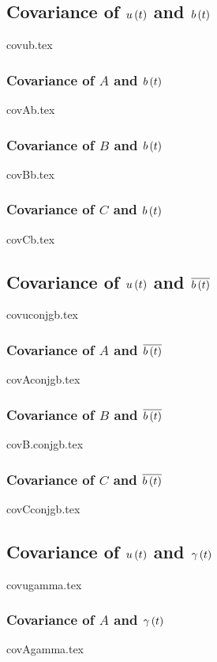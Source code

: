 \documentclass[letterpaper, 12pt]{article}
\begin{document}
		\subsection{Covariance of $u \left( t \right)$ and $b \left( t \right)$} \label{app:cov_u_b}
			{covub.tex}
			\subsubsection{Covariance of $A$ and $b \left( t \right)$} \label{app:cov_A_b}
				{covAb.tex}
			\subsubsection{Covariance of $B$ and $b \left( t \right)$} \label{app:cov_B_b}
				{covBb.tex}
			\subsubsection{Covariance of $C$ and $b \left( t \right)$} \label{app:cov_C_b}
				{covCb.tex}
		\subsection{Covariance of $u \left( t \right)$ and $\overline{b \left( t \right)}$}
			{covuconjgb.tex}
			\subsubsection{Covariance of $A$ and $\overline{b \left( t \right)}$} \label{app:cov_A_conjgb}
				{covAconjgb.tex}
			\subsubsection{Covariance of $B$ and $\overline{b \left( t \right)}$}
				{covB.conjgb.tex} %
			\subsubsection{Covariance of $C$ and $\overline{b \left( t \right)}$} \label{app:cov_C_conjgb}
				{covCconjgb.tex}
		\subsection{Covariance of $u \left( t \right)$ and $\gamma \left( t \right)$}
			{covugamma.tex}
			\subsubsection{Covariance of $A$ and $\gamma \left( t \right)$} \label{app:cov_A_gamma}
				{covAgamma.tex}
\end{document}
